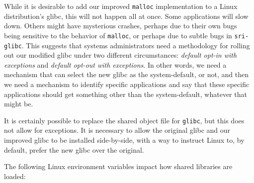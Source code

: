 
While it is desirable to add our improved \texttt{malloc} implementation
to a Linux distribution's glibc, this will not happen all at
once. Some applications will slow down. Others might have mysterious
crashes, perhaps due to their own bugs being sensitive to the behavior
of \texttt{malloc}, or perhaps due to subtle bugs in \texttt{sri-glibc}.
This suggests that systems administrators need a
methodology for rolling out our modified glibc under two
different circumstances: {\em default opt-in with exceptions} and {\em
default opt-out with exceptions}. In other words, we need a mechanism
that can select the new glibc as the system-default, or not, and
then we need a mechanism to identify specific applications and say
that these specific applications should get something other than the
system-default, whatever that might be.


It is certainly possible to replace the shared object file
for \texttt{glibc}, but this does not allow for exceptions. It is
necessary to allow the original glibc and our improved glibc to be
installed side-by-side, with a way to instruct Linux to, by default,
prefer the new glibc over the original.


The following Linux environment variables impact how shared libraries are loaded:

